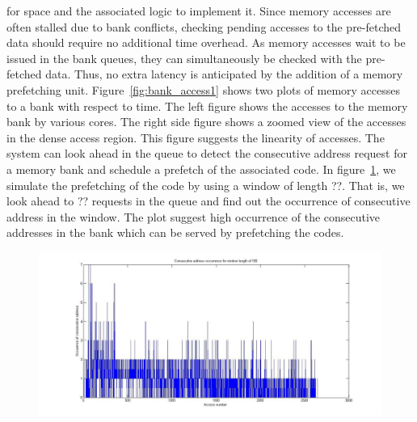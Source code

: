 for space and the associated logic to implement it. Since memory accesses are 
often stalled due to bank conflicts, checking pending accesses to the 
pre-fetched data should require no additional time overhead. As memory accesses 
wait to be issued in the bank queues, they can simultaneously be checked with 
the pre-fetched data. Thus, no extra latency is anticipated by the addition of a 
memory prefetching unit.
Figure~\ref{fig:bank_access1} shows two plots of memory accesses to a bank with 
respect to time. The left figure shows the accesses to the memory bank by 
various cores. The right side figure shows a zoomed view of the accesses in the 
dense access region. This figure suggests the linearity of accesses. The system 
can look ahead in the queue to detect the consecutive address request for a 
memory bank and schedule a prefetch of the associated code.  In 
figure~\ref{fig:queue_lookahead}, we simulate the prefetching of the code by 
using a window of length ??. That is, we look ahead to ?? requests in the queue 
and find out the occurrence of consecutive address in the window. The plot 
suggest high occurrence of the consecutive addresses in the bank which can be 
served by prefetching the codes.  
\begin{figure}[htbp]
\centering
\includegraphics[width=\linewidth]{fig/queue_lookahead.jpg}
\caption{ }
\label{fig:queue_lookahead}
\end{figure} 
 
